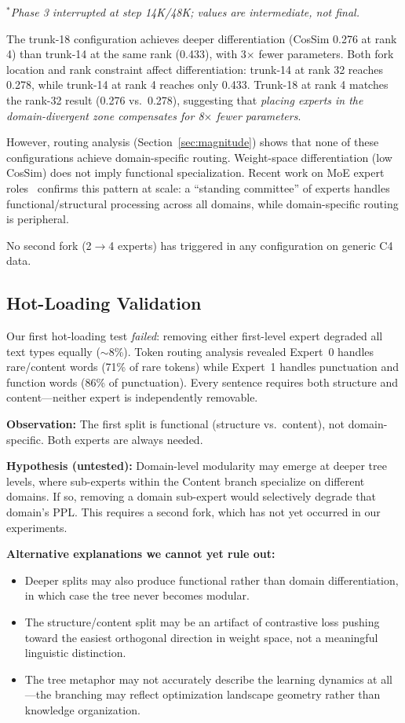 \documentclass{article}
\begin{document}
\noindent $^*$\textit{Phase 3 interrupted at step 14K/48K; values are
intermediate, not final.}

The trunk-18 configuration achieves deeper differentiation (CosSim 0.276 at
rank 4) than trunk-14 at the same rank (0.433), with 3$\times$ fewer
parameters. Both fork location and rank constraint affect differentiation:
trunk-14 at rank 32 reaches 0.278, while trunk-14 at rank 4 reaches only
0.433. Trunk-18 at rank 4 matches the rank-32 result (0.276 vs.\ 0.278),
suggesting that \emph{placing experts in the domain-divergent zone compensates
for 8$\times$ fewer parameters}.

However, routing analysis (Section~\ref{sec:magnitude}) shows that none of
these configurations achieve domain-specific routing. Weight-space
differentiation (low CosSim) does not imply functional specialization. Recent
work on MoE expert roles~\cite{standing2026} confirms this pattern at scale:
a ``standing committee'' of experts handles functional/structural processing
across all domains, while domain-specific routing is peripheral.

No second fork (2$\to$4 experts) has triggered in any configuration on
generic C4 data.

\subsection{Hot-Loading Validation}
\label{sec:hotloading}

Our first hot-loading test \emph{failed}: removing either first-level expert
degraded all text types equally ($\sim$8\%). Token routing analysis
revealed Expert~0 handles rare/content words (71\% of rare tokens) while
Expert~1 handles punctuation and function words (86\% of punctuation). Every
sentence requires both structure and content---neither expert is independently
removable.

\textbf{Observation:} The first split is functional (structure vs.\ content),
not domain-specific. Both experts are always needed.

\textbf{Hypothesis (untested):} Domain-level modularity may emerge at deeper
tree levels, where sub-experts within the Content branch specialize on
different domains. If so, removing a domain sub-expert would selectively
degrade that domain's PPL. This requires a second fork, which has not yet
occurred in our experiments.

\textbf{Alternative explanations we cannot yet rule out:}
\begin{itemize}
    \item Deeper splits may also produce functional rather than domain
          differentiation, in which case the tree never becomes modular.
    \item The structure/content split may be an artifact of contrastive loss
          pushing toward the easiest orthogonal direction in weight space,
          not a meaningful linguistic distinction.
    \item The tree metaphor may not accurately describe the learning dynamics
          at all---the branching may reflect optimization landscape geometry
          rather than knowledge organization.
\end{itemize}
\end{document}
